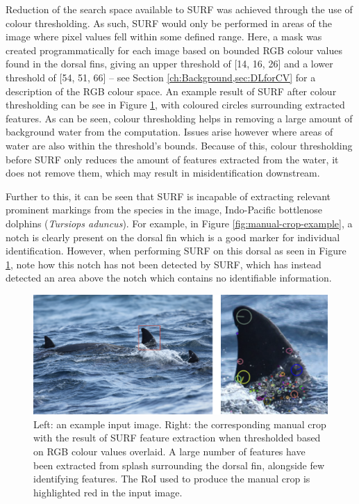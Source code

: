 Reduction of the search space available to SURF was achieved through the use of colour thresholding. As such, SURF would only be performed in areas of the image where pixel values fell within some defined range. Here, a mask was created programmatically for each image based on bounded RGB colour values found in the dorsal fins, giving an upper threshold of [14, 16, 26] and a lower threshold of [54, 51, 66] -- see Section \ref{ch:Background,sec:DLforCV} for a description of the RGB colour space. An example result of SURF after colour thresholding can be see in Figure \ref{fig:manual-crop-surf-colour-thresholding-example}, with coloured circles surrounding extracted features. As can be seen, colour thresholding helps in removing a large amount of background water from the computation. Issues arise however where areas of water are also within the threshold's bounds. Because of this, colour thresholding before SURF only reduces the amount of features extracted from the water, it does not remove them, which may result in misidentification downstream.

Further to this, it can be seen that SURF is incapable of extracting relevant prominent markings from the species in the image, Indo-Pacific bottlenose dolphins (\textit{Tursiops aduncus}). For example, in Figure \ref{fig:manual-crop-example}, a notch is clearly present on the dorsal fin which is a good marker for individual identification. However, when performing SURF on this dorsal as seen in Figure \ref{fig:manual-crop-surf-colour-thresholding-example}, note how this notch has not been detected by SURF, which has instead detected an area above the notch which contains no identifiable information. 

\begin{figure}
	\begin{center}
		\includegraphics[scale=0.6]{Chapter4/figs/manual-crop-surf-colour-thresholding-axis.png}
	\end{center}
	\caption[Left: an example input image. Right: the corresponding manual crop with the result of SURF feature extraction when thresholded based on RGB colour values overlaid.]{Left: an example input image. Right: the corresponding manual crop with the result of SURF feature extraction when thresholded based on RGB colour values overlaid. A large number of features have been extracted from splash surrounding the dorsal fin, alongside few identifying features. The RoI used to produce the manual crop is highlighted red in the input image.
	}
	\label{fig:manual-crop-surf-colour-thresholding-example}
\end{figure}

